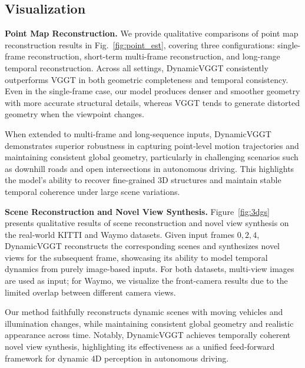 \subsection{Visualization}

\noindent \textbf{Point Map Reconstruction.}  
We provide qualitative comparisons of point map reconstruction results in Fig.~\ref{fig:point_est}, covering three configurations: single-frame reconstruction, short-term multi-frame reconstruction, and long-range temporal reconstruction.
Across all settings, DynamicVGGT consistently outperforms VGGT in both geometric completeness and temporal consistency.
Even in the single-frame case, our model produces denser and smoother geometry with more accurate structural details, whereas VGGT tends to generate distorted geometry when the viewpoint changes.

When extended to multi-frame and long-sequence inputs, DynamicVGGT demonstrates superior robustness in capturing point-level motion trajectories and maintaining consistent global geometry, particularly in challenging scenarios such as downhill roads and open intersections in autonomous driving.
This highlights the model’s ability to recover fine-grained 3D structures and maintain stable temporal coherence under large scene variations.

\noindent \textbf{Scene Reconstruction and Novel View Synthesis.}  
Figure~\ref{fig:3dgs} presents qualitative results of scene reconstruction and novel view synthesis on the real-world KITTI and Waymo datasets.
Given input frames ${0, 2, 4}$, DynamicVGGT reconstructs the corresponding scenes and synthesizes novel views for the subsequent frame, showcasing its ability to model temporal dynamics from purely image-based inputs.
For both datasets, multi-view images are used as input; for Waymo, we visualize the front-camera results due to the limited overlap between different camera views.

Our method faithfully reconstructs dynamic scenes with moving vehicles and illumination changes, while maintaining consistent global geometry and realistic appearance across time.
Notably, DynamicVGGT achieves temporally coherent novel view synthesis, highlighting its effectiveness as a unified feed-forward framework for dynamic 4D perception in autonomous driving.






